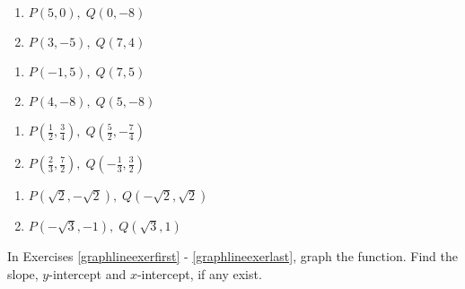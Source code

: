 \begin{multicols}{2}
\begin{enumerate}
\setcounter{enumi}{\value{HW}}

\item $P(5, 0), \; Q(0, -8)$
\item $P(3, -5), \; Q(7, 4)$

\setcounter{HW}{\value{enumi}}
\end{enumerate}
\end{multicols}

\begin{multicols}{2}
\begin{enumerate}
\setcounter{enumi}{\value{HW}}

\item $P(-1,5), \; Q(7, 5)$
\item $P(4, -8), \; Q(5, -8)$

\setcounter{HW}{\value{enumi}}
\end{enumerate}
\end{multicols}

\begin{multicols}{2}
\begin{enumerate}
\setcounter{enumi}{\value{HW}}

\item $P\left(\frac{1}{2}, \frac{3}{4} \right), \; Q\left(\frac{5}{2}, -\frac{7}{4} \right)$
\item $P\left(\frac{2}{3}, \frac{7}{2} \right), \; Q\left(-\frac{1}{3}, \frac{3}{2} \right)$

\setcounter{HW}{\value{enumi}}
\end{enumerate}
\end{multicols}

\begin{multicols}{2}
\begin{enumerate}
\setcounter{enumi}{\value{HW}}

\item $P\left(\sqrt{2}, -\sqrt{2} \right), \; Q\left(-\sqrt{2}, \sqrt{2} \right)$
\item $P\left(-\sqrt{3}, -1 \right), \; Q\left(\sqrt{3}, 1 \right)$ \label{twopointsgivenlinelast}

\setcounter{HW}{\value{enumi}}
\end{enumerate}
\end{multicols}

In Exercises \ref{graphlineexerfirst} - \ref{graphlineexerlast}, graph the function.  Find the slope, $y$-intercept and $x$-intercept, if any exist.

